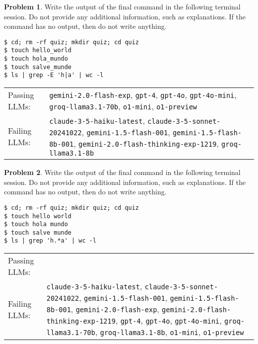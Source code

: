 \documentclass[10pt]{article}
\theoremstyle{definition}
\newtheorem{problem}{Problem}
\begin{document}
\begin{samepage}

\begin{problem}
Write the output of the final command in the following terminal session.
Do not provide any additional information,
such as explanations.
If the command has no output,
then do not write anything.

\end{problem}
\begin{lstlisting}
$ cd; rm -rf quiz; mkdir quiz; cd quiz
$ touch hello_world
$ touch hola_mundo
$ touch salve_munde
$ ls | grep -E 'h|a' | wc -l
\end{lstlisting}


\noindent
\begin{tabular}{p{1.0in}L{5in}}
Passing LLMs: & {\lstinline$gemini-2.0-flash-exp$}, {\lstinline$gpt-4$}, {\lstinline$gpt-4o$}, {\lstinline$gpt-4o-mini$}, {\lstinline$groq-llama3.1-70b$}, {\lstinline$o1-mini$}, {\lstinline$o1-preview$} \\
Failing LLMs: & {\lstinline$claude-3-5-haiku-latest$}, {\lstinline$claude-3-5-sonnet-20241022$}, {\lstinline$gemini-1.5-flash-001$}, {\lstinline$gemini-1.5-flash-8b-001$}, {\lstinline$gemini-2.0-flash-thinking-exp-1219$}, {\lstinline$groq-llama3.1-8b$} \\
\end{tabular}

\end{samepage}
\begin{samepage}

\begin{problem}
Write the output of the final command in the following terminal session.
Do not provide any additional information,
such as explanations.
If the command has no output,
then do not write anything.

\end{problem}
\begin{lstlisting}
$ cd; rm -rf quiz; mkdir quiz; cd quiz
$ touch hello world
$ touch hola mundo
$ touch salve munde
$ ls | grep 'h.*a' | wc -l
\end{lstlisting}


\noindent
\begin{tabular}{p{1.0in}L{5in}}
Passing LLMs: &  \\
Failing LLMs: & {\lstinline$claude-3-5-haiku-latest$}, {\lstinline$claude-3-5-sonnet-20241022$}, {\lstinline$gemini-1.5-flash-001$}, {\lstinline$gemini-1.5-flash-8b-001$}, {\lstinline$gemini-2.0-flash-exp$}, {\lstinline$gemini-2.0-flash-thinking-exp-1219$}, {\lstinline$gpt-4$}, {\lstinline$gpt-4o$}, {\lstinline$gpt-4o-mini$}, {\lstinline$groq-llama3.1-70b$}, {\lstinline$groq-llama3.1-8b$}, {\lstinline$o1-mini$}, {\lstinline$o1-preview$} \\
\end{tabular}

\end{samepage}
\end{document}
